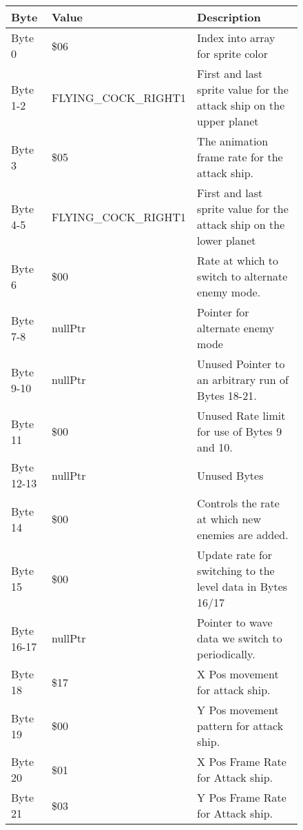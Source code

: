 \begin{figure}[H]
{\begin{adjustbox}{width=12cm}
\begin{tabular}{lll}
\toprule
 Byte       & Value                    & Description                                                         \\
\midrule
 Byte 0     & \$06                      & Index into array for sprite color                                   \\
 Byte 1-2   & FLYING\_COCK\_RIGHT1       & First and last sprite value for the attack ship on the upper planet \\
 Byte 3     & \$05                      & The animation frame rate for the attack ship.                       \\
 Byte 4-5   & FLYING\_COCK\_RIGHT1       & First and last sprite value for the attack ship on the lower planet \\
 Byte 6     & \$00                      & Rate at which to switch to alternate enemy mode.                    \\
 Byte 7-8   & nullPtr                  & Pointer for alternate enemy mode                                    \\
 Byte 9-10  & nullPtr                  & Unused Pointer to an arbitrary run of Bytes 18-21.                  \\
 Byte 11    & \$00                      & Unused Rate limit for use of Bytes 9 and 10.                        \\
 Byte 12-13 & nullPtr                  & Unused Bytes                                                        \\
 Byte 14    & \$00                      & Controls the rate at which new enemies are added.                   \\
 Byte 15    & \$00                      & Update rate for switching to the level data in Bytes 16/17          \\
 Byte 16-17 & nullPtr                  & Pointer to wave data we switch to periodically.                     \\
 Byte 18    & \$17                      & X Pos movement for attack ship.                                     \\
 Byte 19    & \$00                      & Y Pos movement pattern for attack ship.                             \\
 Byte 20    & \$01                      & X Pos Frame Rate for Attack ship.                                   \\
 Byte 21    & \$03                      & Y Pos Frame Rate for Attack ship.                                   \\

\end{tabular}
\end{adjustbox}}
\end{figure}
